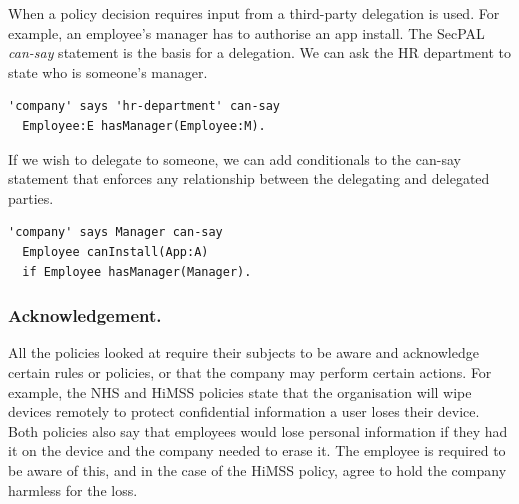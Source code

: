 \documentclass{llncs}
\begin{document}

When a policy decision requires input from a third-party delegation is used.
For example, an employee's manager has to authorise an app install.
The SecPAL \emph{can-say} statement is the basis for a delegation. 
We can ask the HR department to state who is someone's manager.
\begin{lstlisting}
'company' says 'hr-department' can-say 
  Employee:E hasManager(Employee:M).
\end{lstlisting}
If we wish to delegate to someone, we can add conditionals to the can-say statement that enforces any relationship between the delegating and delegated parties.
\begin{lstlisting}
'company' says Manager can-say 
  Employee canInstall(App:A)
  if Employee hasManager(Manager).
\end{lstlisting}

\subsubsection{Acknowledgement.}

All the policies looked at require their subjects to be aware and acknowledge certain rules or policies, 
  or that the company may perform certain actions.
For example, the NHS and \ac{HiMSS} policies state that the organisation will wipe devices remotely to protect confidential information a user loses their device.
Both policies also say that employees would lose personal information if they had it on the device and the company needed to erase it.
The employee is required to be aware of this, and in the case of the \ac{HiMSS} policy, agree to hold the company harmless for the loss.
\end{document}
